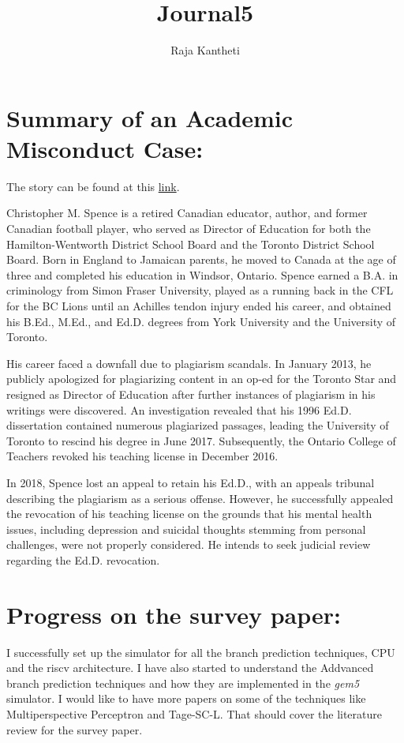 \documentclass{article}
\title{Journal5}
\author{Raja Kantheti}
\begin{document}
\maketitle

\section*{Summary of an Academic Misconduct Case: }
The story can be found at this \href{https://en.wikipedia.org/wiki/Chris_Spence_(educator)}{link}.


Christopher M. Spence is a retired Canadian educator, author, and former Canadian football player, who served as Director of Education for both the Hamilton-Wentworth District School Board and the Toronto District School Board. Born in England to Jamaican parents, he moved to Canada at the age of three and completed his education in Windsor, Ontario. Spence earned a B.A. in criminology from Simon Fraser University, played as a running back in the CFL for the BC Lions until an Achilles tendon injury ended his career, and obtained his B.Ed., M.Ed., and Ed.D. degrees from York University and the University of Toronto.

His career faced a downfall due to plagiarism scandals. In January 2013, he publicly apologized for plagiarizing content in an op-ed for the Toronto Star and resigned as Director of Education after further instances of plagiarism in his writings were discovered. An investigation revealed that his 1996 Ed.D. dissertation contained numerous plagiarized passages, leading the University of Toronto to rescind his degree in June 2017. Subsequently, the Ontario College of Teachers revoked his teaching license in December 2016.

In 2018, Spence lost an appeal to retain his Ed.D., with an appeals tribunal describing the plagiarism as a serious offense. However, he successfully appealed the revocation of his teaching license on the grounds that his mental health issues, including depression and suicidal thoughts stemming from personal challenges, were not properly considered. He intends to seek judicial review regarding the Ed.D. revocation.
\section*{Progress on the survey paper:}
I successfully set up the simulator for all the branch prediction techniques, CPU and the riscv architecture.
I have also started to understand the Addvanced branch prediction techniques and how they are implemented in the \emph{gem5} simulator.
I would like to have more papers on some of the techniques like Multiperspective Perceptron and Tage-SC-L. That should cover the literature review for the survey paper. 
\end{document}

